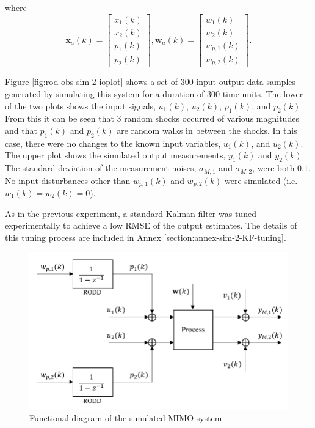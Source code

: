 where
\begin{equation} \label{eq:sim-sys-2x2-ss-aug2}
	\mathbf{x}_{a}(k) = \left[\begin{array}{l}
		x_{1}(k) \\
		x_{2}(k) \\
		p_{1}(k) \\
		p_{2}(k)
	\end{array}\right], \mathbf{w}_{a}(k) = \left[\begin{array}{l}
		w_1(k) \\
		w_2(k) \\
		w_{p,1}(k) \\
		w_{p,2}(k)
	\end{array}\right].
\end{equation}

Figure \ref{fig:rod-obs-sim-2-ioplot} shows a set of  300 input-output  data samples generated by simulating this system for a duration of 300 time units. The lower of the two plots shows the input signals, $u_1(k)$, $u_2(k)$, $p_1(k)$, and $p_2(k)$. From this it can be seen that 3 random shocks occurred of various magnitudes and that $p_1(k)$ and $p_2(k)$ are random walks in between the shocks. In this case, there were no changes to the known input variables, $u_1(k)$, and $u_2(k)$. The upper plot shows the simulated output measurements, $y_1(k)$ and $y_2(k)$. The standard deviation of the measurement noises, $\sigma_{M,1}$ and $\sigma_{M,2}$, were both $0.1$. No input disturbances other than $w_{p,1}(k)$ and $w_{p,2}(k)$ were simulated (i.e. $w_1(k)=w_2(k)=0$).

As in the previous experiment, a standard Kalman filter was tuned experimentally to achieve a low RMSE of the output estimates.  The details of this tuning process are included in Annex \ref{section:annex-sim-2-KF-tuning}. 

\begin{figure}[htp]
	\centering
	\includegraphics[width=11.5cm]{images/sim-sys-diag-2x2.pdf}
	\caption{Functional diagram of the simulated MIMO system}
	\label{fig:sim-sys-diag-2x2}
\end{figure}

